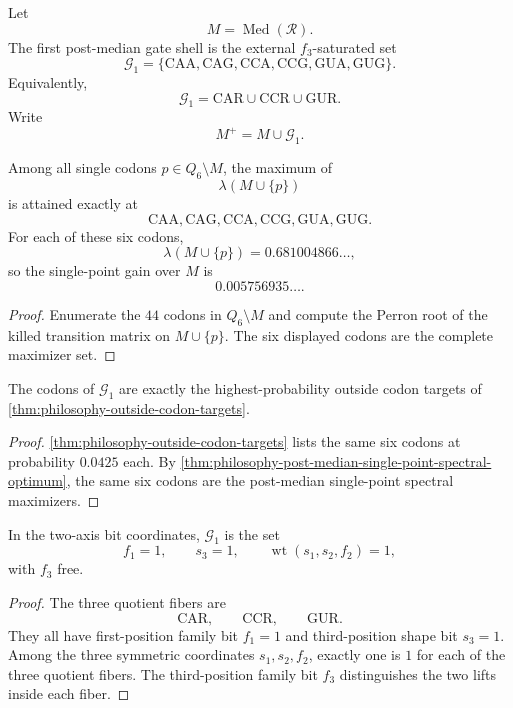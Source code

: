 \begin{definition}
\label{def:philosophy-post-median-gate-shell}
Let
$$
  M=\operatorname{Med}(\mathcal R).
$$
The first post-median gate shell is the external $f_{3}$-saturated set
$$
  \mathcal G_{1}
  =
  \{\mathrm{CAA},\mathrm{CAG},
    \mathrm{CCA},\mathrm{CCG},
    \mathrm{GUA},\mathrm{GUG}\}.
$$
Equivalently,
$$
  \mathcal G_{1}
  =
  \mathrm{CAR}\cup\mathrm{CCR}\cup\mathrm{GUR}.
$$
Write
$$
  M^{+}=M\cup\mathcal G_{1}.
$$
\end{definition}

\begin{theorem}
\label{thm:philosophy-post-median-single-point-spectral-optimum}
Among all single codons $p\in Q_{6}\setminus M$, the maximum of
$$
  \lambda(M\cup\{p\})
$$
is attained exactly at
$$
  \mathrm{CAA},\mathrm{CAG},
  \mathrm{CCA},\mathrm{CCG},
  \mathrm{GUA},\mathrm{GUG}.
$$
For each of these six codons,
$$
  \lambda(M\cup\{p\})=0.681004866\ldots,
$$
so the single-point gain over $M$ is
$$
  0.005756935\ldots.
$$
\end{theorem}
\begin{proof}
Enumerate the $44$ codons in $Q_{6}\setminus M$ and compute the Perron
root of the killed transition matrix on $M\cup\{p\}$. The six displayed
codons are the complete maximizer set.
\end{proof}

\begin{corollary}
\label{cor:philosophy-gate-shell-first-exit-targets}
The codons of $\mathcal G_{1}$ are exactly the highest-probability
outside codon targets of
\autoref{thm:philosophy-outside-codon-targets}.
\end{corollary}
\begin{proof}
\autoref{thm:philosophy-outside-codon-targets} lists the same six codons
at probability $0.0425$ each. By
\autoref{thm:philosophy-post-median-single-point-spectral-optimum}, the
same six codons are the post-median single-point spectral maximizers.
\end{proof}

\begin{theorem}
\label{thm:philosophy-gate-shell-boolean-form}
In the two-axis bit coordinates, $\mathcal G_{1}$ is the set
$$
  f_{1}=1,\qquad
  s_{3}=1,\qquad
  \operatorname{wt}(s_{1},s_{2},f_{2})=1,
$$
with $f_{3}$ free.
\end{theorem}
\begin{proof}
The three quotient fibers are
$$
  \mathrm{CAR},\qquad \mathrm{CCR},\qquad \mathrm{GUR}.
$$
They all have first-position family bit $f_{1}=1$ and third-position
shape bit $s_{3}=1$. Among the three symmetric coordinates
$s_{1},s_{2},f_{2}$, exactly one is $1$ for each of the three quotient
fibers. The third-position family bit $f_{3}$ distinguishes the two
lifts inside each fiber.
\end{proof}

